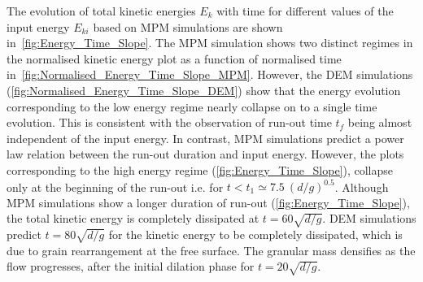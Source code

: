 \documentclass[3p,times,procedia,number]{elsarticle}
\begin{document}
The evolution of total kinetic energies $E_k$ with time for different values of 
the input energy $E_{ki}$ based on MPM simulations are shown 
in~\cref{fig:Energy_Time_Slope}. The MPM simulation shows two distinct regimes 
in the normalised kinetic energy plot as a function of normalised time 
in~\cref{fig:Normalised_Energy_Time_Slope_MPM}. However, the DEM simulations 
(\cref{fig:Normalised_Energy_Time_Slope_DEM}) show that the energy evolution 
corresponding to the low energy regime nearly collapse on to a single time 
evolution. This is consistent with the observation of run-out time $t_f$ being 
almost independent of the input energy. In contrast, MPM simulations predict a power 
law relation between the run-out duration and input energy. However, the 
plots corresponding to the high energy regime (\cref{fig:Energy_Time_Slope}), 
collapse only at the beginning of the run-out i.e. for $t < t_1 \simeq 7.5 \ 
(d/g)^{0.5}$. Although MPM simulations show a longer duration of run-out 
(\cref{fig:Energy_Time_Slope}), the total kinetic energy is completely 
dissipated at $t = 60 \sqrt{d/g}$. DEM simulations predict $t = 80 \sqrt{d/g}$ 
for the kinetic energy to be completely dissipated, which is due to grain 
rearrangement at the free surface. The granular mass densifies as the flow
progresses, after the initial dilation phase for $t = 20\sqrt{d/g}$.
\end{document}
